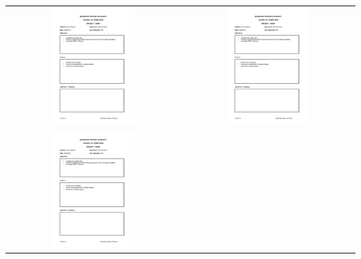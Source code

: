\documentclass[12pt,a4paper]{article}
\begin{document}
\begin{appendices}
\begin{longtable}{@{}cc@{}}
\includegraphics[page=7, width=0.5\textwidth]{figures/diaries} &
\includegraphics[page=8, width=0.5\textwidth]{figures/diaries} \\
\includegraphics[page=9, width=0.5\textwidth]{figures/diaries} &

\end{longtable}
\end{appendices}
\end{document}
